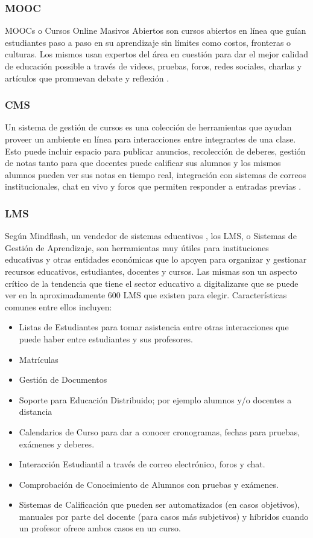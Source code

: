 \subsubsection{MOOC}
MOOCs o Cursos Online Masivos Abiertos son cursos abiertos en línea que guían estudiantes paso a paso en su aprendizaje sin límites como costos, fronteras o culturas. Los mismos usan expertos del área en cuestión para dar el mejor calidad de educación possible a través de videos, pruebas, foros, redes sociales, charlas y artículos que promuevan debate y reflexión \citep{UEA-What-is-a-MOOC}.

\subsubsection{CMS}
Un sistema de gestión de cursos es una colección de herramientas que ayudan proveer un ambiente en línea para interacciones entre integrantes de una clase. Esto puede incluir espacio para publicar anuncios, recolección de deberes, gestión de notas tanto para que docentes puede calificar sus alumnos y los mismos alumnos pueden ver sus notas en tiempo real, integración con sistemas de correos institucionales, chat en vivo y foros que permiten responder a entradas previas  \citep{Vanderbilt-Course-Management-Systems}.

\subsubsection{LMS}
Según Mindflash, un vendedor de sistemas educativos \citep{MINDFLASH-ABOUT}, los LMS, o Sistemas de Gestión de Aprendizaje, son herramientas muy útiles para instituciones educativas y otras entidades económicas que lo apoyen para organizar y gestionar recursos educativos, estudiantes, docentes y cursos. Las mismas son un aspecto crítico de la tendencia que tiene el sector educativo a digitalizarse que se puede ver en la aproximadamente 600 LMS que existen para elegir. Características comunes entre ellos incluyen: \citep{MINDFLASH-LMS}
\begin{itemize}
	\item Listas de Estudiantes para tomar asistencia entre otras interacciones que puede haber entre estudiantes y sus profesores.
    \item Matrículas
    \item Gestión de Documentos
    \item Soporte para Educación Distribuido; por ejemplo alumnos y/o docentes a distancia
    \item Calendarios de Curso para dar a conocer cronogramas, fechas para pruebas, exámenes y deberes.
    \item Interacción Estudiantil a través de correo electrónico, foros y chat.
    \item Comprobación de Conocimiento de Alumnos con pruebas y exámenes.
    \item Sistemas de Calificación que pueden ser automatizados (en casos objetivos), manuales por parte del docente (para casos más subjetivos) y híbridos cuando un profesor ofrece ambos casos en un curso.
\end{itemize}

